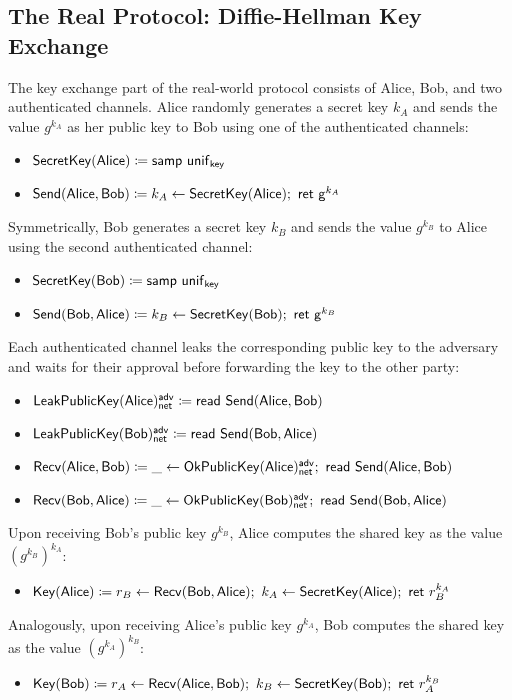 \subsection{The Real Protocol: Diffie-Hellman Key Exchange}
The key exchange part of the real-world protocol consists of Alice, Bob, and two authenticated channels. Alice randomly generates a secret key $k_A$ and sends the value $g^{k_A}$ as her public key to Bob using one of the authenticated channels:
\begin{itemize}
\item $\mathsf{SecretKey}(\mathsf{Alice}) \coloneqq \mathsf{samp} \ \mathsf{unif}_{\mathsf{key}}$
\item $\mathsf{Send}(\mathsf{Alice},\mathsf{Bob}) \coloneqq k_A \leftarrow \mathsf{SecretKey}(\mathsf{Alice}); \ \mathsf{ret} \ \mathsf{g}^{k_A}$
\end{itemize}
Symmetrically, Bob generates a secret key $k_B$ and sends the value $g^{k_B}$ to Alice using the second authenticated channel:
\begin{itemize}
\item $\mathsf{SecretKey}(\mathsf{Bob}) \coloneqq \mathsf{samp} \ \mathsf{unif}_{\mathsf{key}}$
\item $\mathsf{Send}(\mathsf{Bob},\mathsf{Alice}) \coloneqq k_B \leftarrow \mathsf{SecretKey}(\mathsf{Bob}); \ \mathsf{ret} \ \mathsf{g}^{k_B}$
\end{itemize}
Each authenticated channel leaks the corresponding public key to the adversary and waits for their approval before forwarding the key to the other party:
\begin{itemize}
\item $\mathsf{LeakPublicKey}(\mathsf{Alice})^{\mathsf{adv}}_{\mathsf{net}} \coloneqq \mathsf{read} \ \mathsf{Send}(\mathsf{Alice},\mathsf{Bob})$
\item $\mathsf{LeakPublicKey}(\mathsf{Bob})^{\mathsf{adv}}_{\mathsf{net}} \coloneqq \mathsf{read} \ \mathsf{Send}(\mathsf{Bob},\mathsf{Alice})$
\item $\Recv(\Alice,\Bob) \coloneqq \_ \leftarrow \OkPublicKey(\Alice)^\adv_\net; \ \read{\Send(\Alice,\Bob)}$
\item $\Recv(\Bob,\Alice) \coloneqq \_ \leftarrow \OkPublicKey(\Bob)^\adv_\net; \ \read{\Send(\Bob,\Alice)}$
\end{itemize}
Upon receiving Bob's public key $g^{k_B}$, Alice computes the shared key as the value $(g^{k_B})^{k_A}$:
\begin{itemize}
\item $\Key(\Alice) \coloneqq r_B \leftarrow \Recv(\Bob,\Alice); \ k_A \leftarrow \SecretKey(\Alice); \ \ret{r_B^{k_A}}$
\end{itemize}
Analogously, upon receiving Alice's public key $g^{k_A}$, Bob computes the shared key as the value $(g^{k_A})^{k_B}$:
\begin{itemize}
\item $\Key(\Bob) \coloneqq r_A \leftarrow \Recv(\Alice,\Bob); \ k_B \leftarrow \SecretKey(\Bob); \ \ret{r_A^{k_B}}$
\end{itemize}
